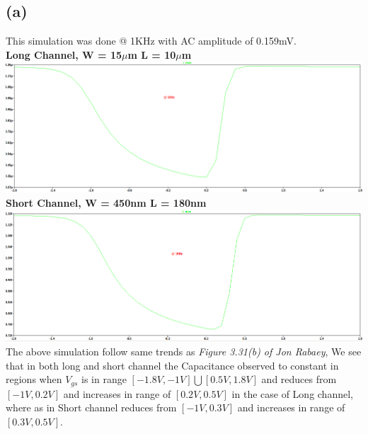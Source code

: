 \documentclass{article}
\begin{document}
\subsection*{(a)}
This simulation was done @ 1KHz with AC amplitude of 0.159mV.\\
\textbf{Long Channel, W = 15$\mu$m L = 10$\mu$m}\\
\includegraphics[scale=0.33]{./figs/Q2_nmos_lc_1K.png}\\
 \newline
\textbf{Short Channel, W = 450nm L = 180nm}\\
\includegraphics[scale=0.33]{./figs/Q2_nmos_sc_1K.png}\\
 \newline
The above simulation follow same trends as \textit{Figure 3.31(b) of Jon Rabaey}, We see that in both long and short channel the Capacitance observed to constant in regions when $V_{gs}$ is in range $[-1.8V, -1V] \bigcup [0.5V, 1.8V]$ and reduces from $[-1V, 0.2V]$ and increases in range of $[0.2V, 0.5V]$ in the case of Long channel, where as in Short channel reduces from $[-1V, 0.3V]$ and increases in range of $[0.3V, 0.5V]$.
\end{document}
